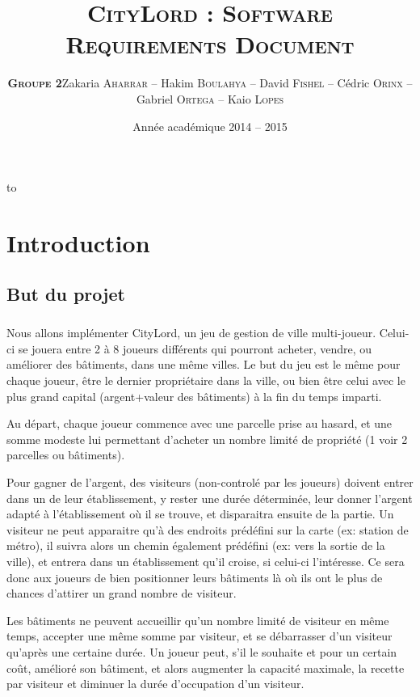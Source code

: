 \documentclass[a4paper,11pt]{report}
\date{Année académique 2014 – 2015}
\title{ \textsc{CityLord} :
\textsc{Software Requirements Document}\\}
\author{\textsc{\textbf{Groupe 2}}\newline Zakaria \textsc{Aharrar} – Hakim \textsc{Boulahya} – David \textsc{Fishel} – Cédric \textsc{Orinx} – Gabriel \textsc{Ortega} – Kaio \textsc{Lopes}}
\makeatletter
\def\clap#1{\hbox to 0pt{\hss #1\hss}}%
\def\haut#1#2#3{%
\hbox to \hsize{%
\rlap{\vtop{\centering #1}}%
\hss
\clap{\vtop{\centering #2}}%
\hss
\llap{\vtop{\centering #3}}}}%
\def\bas#1#2#3{%
\hbox to \hsize{%
\rlap{\vbox{\centering #1}}%
\hss
\clap{\vbox{\centering #2}}%
\hss
\llap{\vbox{\centering #3}}}}%
\def\maketitle{%
\thispagestyle{empty}\vbox to \vsize{%
\haut{}{\@blurb}{}
\vfill
\vspace{1cm}
\begin{flushleft}
\usefont{OT1}{ptm}{m}{n}
\huge \@title
\end{flushleft}
\par
\hrule height 4pt
\par
\begin{flushright}
\usefont{OT1}{phv}{m}{n}
\Large \@author
\par
\end{flushright}
\vspace{1cm}
\vfill
\vfill
\bas{}{\@date}{}
}%
\cleardoublepage
}
\makeatother
\begin{document}
\maketitle
\tableofcontents
\clearpage

\chapter{Introduction}
\section{But du projet}
\paragraph{}
Nous allons implémenter CityLord, un jeu de gestion de ville multi-joueur.
Celui-ci se jouera entre 2 à 8 joueurs différents qui pourront acheter, vendre, ou améliorer des bâtiments, dans une même villes.
Le but du jeu est le même pour chaque joueur, être le dernier propriétaire dans la ville, ou bien être celui avec le plus grand capital (argent+valeur des bâtiments) à la fin du temps imparti.

Au départ, chaque joueur commence avec une parcelle prise au hasard, et une somme modeste lui permettant d'acheter un nombre limité de propriété (1 voir 2 parcelles ou bâtiments).

Pour gagner de l'argent, des visiteurs (non-controlé par les joueurs) doivent entrer dans un de leur établissement, y rester une durée déterminée, leur donner l'argent adapté à l'établissement où il se trouve, et disparaitra ensuite de la partie.
Un visiteur ne peut apparaitre qu'à des endroits prédéfini sur la carte (ex: station de métro), il suivra alors un chemin également prédéfini (ex: vers la sortie de la ville), et entrera dans un établissement qu'il croise, si celui-ci l’intéresse.
Ce sera donc aux joueurs de bien positionner leurs bâtiments là où ils ont le plus de chances d'attirer un grand nombre de visiteur.

Les bâtiments ne peuvent accueillir qu'un nombre limité de visiteur en même temps, accepter une même somme par visiteur, et se débarrasser d'un visiteur qu'après une certaine durée.
Un joueur peut, s'il le souhaite et pour un certain coût, amélioré son bâtiment, et alors augmenter la capacité maximale, la recette par visiteur et diminuer la durée d'occupation d'un visiteur.
\end{document}
